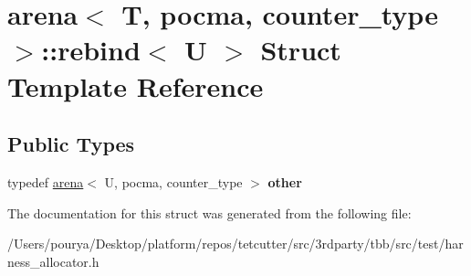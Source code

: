 \hypertarget{structarena_1_1rebind}{}\section{arena$<$ T, pocma, counter\+\_\+type $>$\+:\+:rebind$<$ U $>$ Struct Template Reference}
\label{structarena_1_1rebind}
\subsection*{Public Types}
\begin{DoxyCompactItemize}
\item 
\hypertarget{structarena_1_1rebind_a491f15feffe22d58c746c58a99f24d3c}{}typedef \hyperlink{structarena}{arena}$<$ U, pocma, counter\+\_\+type $>$ {\bfseries other}\label{structarena_1_1rebind_a491f15feffe22d58c746c58a99f24d3c}

\end{DoxyCompactItemize}


The documentation for this struct was generated from the following file\+:\begin{DoxyCompactItemize}
\item 
/\+Users/pourya/\+Desktop/platform/repos/tetcutter/src/3rdparty/tbb/src/test/harness\+\_\+allocator.\+h\end{DoxyCompactItemize}
